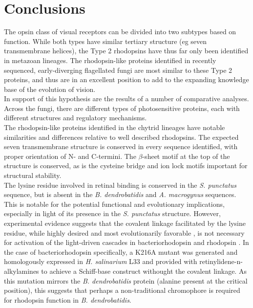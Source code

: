 \section{Conclusions}
The opsin class of visual receptors can be divided into two subtypes based on function. While both types have similar tertiary structure (eg seven transmembrane helices), the Type 2 rhodopsins have thus far only been identified in metazoan lineages. The rhodopsin-like proteins identified in recently sequenced, early-diverging flagellated fungi are most similar to these Type 2 proteins, and thus are in an excellent position to add to the expanding knowledge base of the evolution of vision.\\
\indent In support of this hypothesis are the results of a number of comparative analyses. Across the fungi, there are different types of photosensitive proteins, each with different structures and regulatory mechanisms.\\
\indent The rhodopsin-like proteins identified in the chytrid lineages have notable similarities and differences relative to well described rhodopsins. The expected seven transmembrane structure is conserved in every sequence identified, with proper orientation of N- and C-termini. The $\beta$-sheet motif at the top of the structure is conserved, as is the cysteine bridge and ion lock motifs important for structural stability.\\
\indent The lysine residue involved in retinal binding is conserved in the \textit{S. punctatus} sequence, but is absent in the \textit{B. dendrobatidis} and \textit{A. macrogynus} sequences. This is notable for the potential functional and evolutionary implications, especially in light of its presence in the \textit{S. punctatus} structure. However, experimental evidence suggests that the covalent linkage facilitated by the lysine residue, while highly desired and most evolutionarily favorable \cite{Sekharan2011}, is not necessary for activation of the light-driven cascades in bacteriorhodopsin \cite{Schweiger1994} and rhodopsin \cite{Zhukovsky1992}. In the case of bacteriorhodopsin specifically, a K216A mutant was generated and homologously expressed in \textit{H. salinarium} L33 and provided with retinylidene-n-alkylamines to achieve a Schiff-base construct withought the covalent linkage. As this mutation mirrors the \textit{B. dendrobatidis} protein (alanine present at the critical position), this suggests that perhaps a non-traditional chromophore is required for rhodopsin function in \textit{B. dendrobatidis}.\\
